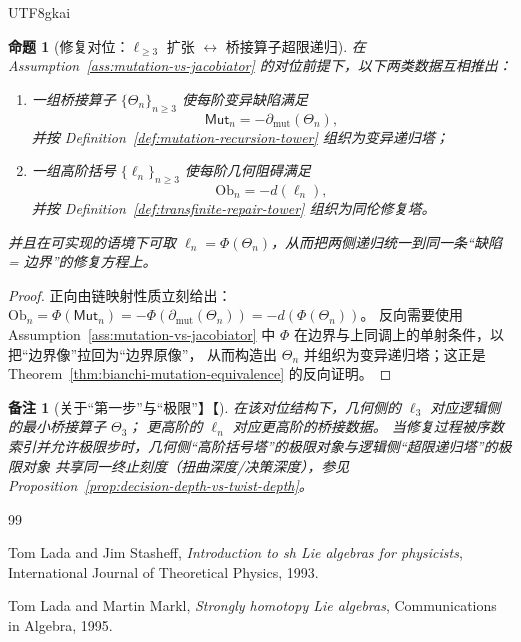 \documentclass[12pt]{article}
\newtheorem{proposition}{命题}[section]
\newtheorem{remark}{备注}[section]
\newcommand{\Layer}{\ensuremath{\ell}}
\newcommand{\Ob}{\mathrm{Ob}}
\begin{document}
\begin{CJK*}{UTF8}{gkai}
\begin{proposition}[修复对位：$\Layer_{\ge 3}$ 扩张 $\leftrightarrow$ 桥接算子超限递归]
\label{prop:equiv-repair}
在 Assumption~\ref{ass:mutation-vs-jacobiator} 的对位前提下，以下两类数据互相推出：
\begin{enumerate}
  \item 一组桥接算子 $\{\Theta_n\}_{n\ge 3}$ 使每阶变异缺陷满足
        \[
          \mathsf{Mut}_n=-\partial_{\mathrm{mut}}(\Theta_n),
        \]
        并按 Definition~\ref{def:mutation-recursion-tower} 组织为变异递归塔；
  \item 一组高阶括号 $\{\Layer_n\}_{n\ge 3}$ 使每阶几何阻碍满足
        \[
          \Ob_n=-d(\Layer_n),
        \]
        并按 Definition~\ref{def:transfinite-repair-tower} 组织为同伦修复塔。
\end{enumerate}
并且在可实现的语境下可取 $\Layer_n=\Phi(\Theta_n)$，从而把两侧递归统一到同一条“缺陷 = 边界”的修复方程上。
\end{proposition}

\begin{proof}
正向由链映射性质立刻给出：$\Ob_n=\Phi(\mathsf{Mut}_n)=-\Phi(\partial_{\mathrm{mut}}(\Theta_n))=-d(\Phi(\Theta_n))$。
反向需要使用 Assumption~\ref{ass:mutation-vs-jacobiator} 中 $\Phi$ 在边界与上同调上的单射条件，以把“边界像”拉回为“边界原像”，
从而构造出 $\Theta_n$ 并组织为变异递归塔；这正是 Theorem~\ref{thm:bianchi-mutation-equivalence} 的反向证明。
\end{proof}

\begin{remark}[关于“第一步”与“极限”】【\cite{HomotopyMinimalityDialogue}]
在该对位结构下，几何侧的 $\Layer_3$ 对应逻辑侧的最小桥接算子 $\Theta_3$；
更高阶的 $\Layer_n$ 对应更高阶的桥接数据。
当修复过程被序数索引并允许极限步时，几何侧“高阶括号塔”的极限对象与逻辑侧“超限递归塔”的极限对象
共享同一终止刻度（扭曲深度/决策深度），参见 Proposition~\ref{prop:decision-depth-vs-twist-depth}。
\end{remark}

\clearpage

\renewcommand{\refname}{\texorpdfstring{参考文献}{References}}
\begin{thebibliography}{99}

Tom Lada and Jim Stasheff, \emph{Introduction to sh Lie algebras for physicists}, International Journal of Theoretical
  Physics, 1993.

Tom Lada and Martin Markl, \emph{Strongly homotopy Lie algebras}, Communications in Algebra, 1995.


\end{thebibliography}
\end{CJK*}
\end{document}
